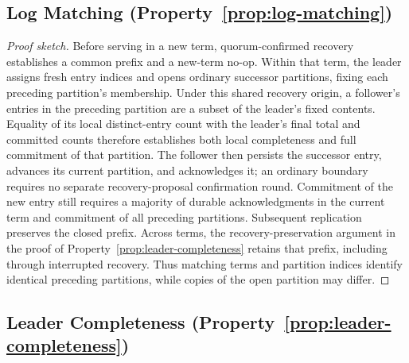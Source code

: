 \subsection{Log Matching (Property~\ref{prop:log-matching})}
\label{subsec:proof-log-matching}

\begin{proof}[Proof sketch]
Before serving in a new term, quorum-confirmed recovery establishes a
common prefix and a new-term no-op. Within that term, the leader assigns
fresh entry indices and opens ordinary successor partitions, fixing each
preceding partition's membership. Under this shared recovery origin, a
follower's entries in the preceding partition are a subset of the leader's
fixed contents. Equality of its local distinct-entry count with the
leader's final total and committed counts therefore establishes both
local completeness and full commitment of that partition. The follower
then persists the successor entry, advances its current partition, and
acknowledges it; an ordinary boundary requires no separate recovery-proposal
confirmation round. Commitment of the new entry still requires a majority
of durable acknowledgments in the current term and commitment of all
preceding partitions. Subsequent replication preserves the closed prefix.
Across terms, the recovery-preservation argument in the proof of
Property~\ref{prop:leader-completeness} retains that prefix,
including through interrupted recovery. Thus matching terms and partition
indices identify identical preceding partitions, while copies of the
open partition may differ.
\end{proof}

\subsection{Leader Completeness (Property~\ref{prop:leader-completeness})}
\label{subsec:proof-leader-completeness}

